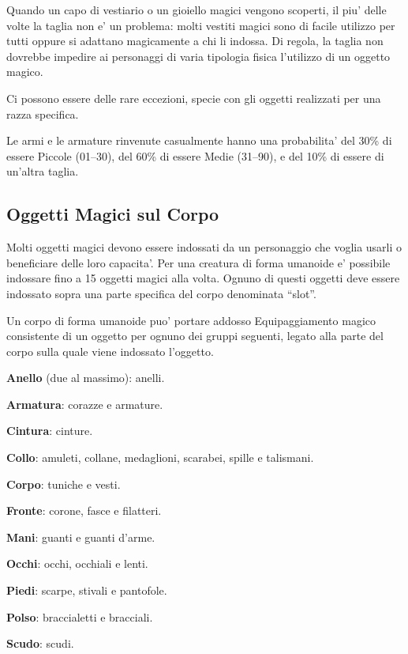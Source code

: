 \documentclass[a4paper,11pt,twoside,openany]{dndbook}
\begin{document}
\label{taglia-e-oggetti-magici}

Quando un capo di vestiario o un gioiello magici vengono scoperti, il piu' delle volte la taglia non e' un problema: molti vestiti magici sono di facile utilizzo per tutti oppure si adattano magicamente a chi li indossa. Di regola, la taglia non dovrebbe impedire ai personaggi di varia tipologia fisica l'utilizzo di un oggetto magico. 

Ci possono essere delle rare eccezioni, specie con gli oggetti realizzati per una razza specifica.

Le armi e le armature rinvenute casualmente hanno una probabilita' del 30\% di essere Piccole (01--30), del 60\% di essere Medie (31--90), e del 10\% di essere di un'altra taglia.

\subsection{Oggetti Magici sul Corpo}

\label{oggetti-magici-sul-corpo}

Molti oggetti magici devono essere indossati da un personaggio che voglia usarli o beneficiare delle loro capacita'. Per una creatura di forma umanoide e' possibile indossare fino a 15 oggetti magici alla volta. Ognuno di questi oggetti deve essere indossato sopra una parte specifica del corpo denominata ``slot''.

Un corpo di forma umanoide puo' portare addosso Equipaggiamento magico consistente di un oggetto per ognuno dei gruppi seguenti, legato alla parte del corpo sulla quale viene indossato l'oggetto.

\textbf{Anello} (due al massimo): anelli.

\textbf{Armatura}: corazze e armature.

\textbf{Cintura}: cinture.

\textbf{Collo}: amuleti, collane, medaglioni, scarabei, spille e talismani.

\textbf{Corpo}: tuniche e vesti.

\textbf{Fronte}: corone, fasce e filatteri.

\textbf{Mani}: guanti e guanti d'arme.

\textbf{Occhi}: occhi, occhiali e lenti.

\textbf{Piedi}: scarpe, stivali e pantofole.

\textbf{Polso}: braccialetti e bracciali.

\textbf{Scudo}: scudi.
\end{document}
